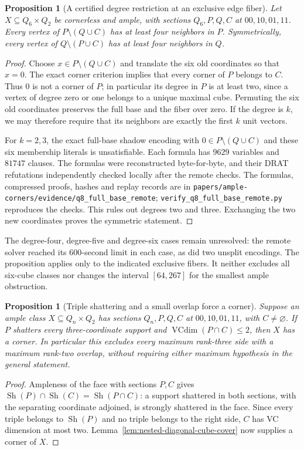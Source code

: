 \documentclass[11pt]{article}
\numberwithin{equation}{section}
\newtheorem{proposition}[theorem]{Proposition}
\theoremstyle{definition}
\theoremstyle{remark}
\begin{document}
\begin{proposition}[A certified degree restriction at an exclusive edge fiber]
\label{prop:full-base-exclusive-degree}
Let $X\subseteq Q_6\times Q_2$ be cornerless and ample, with sections
$Q_6,P,Q,C$ at $00,10,01,11$. Every vertex of
$P\setminus(Q\cup C)$ has at least four neighbors in $P$.
Symmetrically, every vertex of $Q\setminus(P\cup C)$ has at least
four neighbors in $Q$.
\end{proposition}
\begin{proof}
Choose $x\in P\setminus(Q\cup C)$ and translate the six old
coordinates so that $x=0$. The exact corner criterion implies that
every corner of $P$ belongs to $C$. Thus $0$ is not a corner of $P$;
in particular its degree in $P$ is at least two, since a vertex of
degree zero or one belongs to a unique maximal cube.
Permuting the six old coordinates preserves the full base and the
fiber over zero. If the degree is $k$, we may therefore require
that its neighbors are exactly the first $k$ unit vectors.

For $k=2,3$, the exact full-base shadow encoding with
$0\in P\setminus(Q\cup C)$ and these six membership literals is
unsatisfiable. Each formula has $9629$ variables and $81747$ clauses.
The formulas were reconstructed byte-for-byte, and their DRAT
refutations independently checked locally after the remote checks.
The formulas, compressed proofs, hashes and replay records are in
\texttt{papers/ample-corners/evidence/q8\_full\_base\_remote};
\texttt{verify\_q8\_full\_base\_remote.py} reproduces the checks.
This rules out degrees two and three. Exchanging the two new
coordinates proves the symmetric statement.
\end{proof}

The degree-four, degree-five and degree-six cases remain unresolved:
the remote solver reached its $600$-second limit in each case, as did
two unsplit encodings. The proposition applies only to the indicated
exclusive fibers. It neither excludes all six-cube classes nor changes
the interval $[64,267]$ for the smallest ample obstruction.

\begin{proposition}[Triple shattering and a small overlap force a corner]
\label{prop:maximum-relative-pair-no-completion}
Suppose an ample class $X\subseteq Q_n\times Q_2$ has sections
$Q_n,P,Q,C$ at $00,10,01,11$, with $C\ne\varnothing$.
If $P$ shatters every three-coordinate support and
$\operatorname{VCdim}(P\cap C)\le2$, then $X$ has a corner.
In particular this excludes every maximum rank-three side with a
maximum rank-two overlap, without requiring either maximum hypothesis
in the general statement.
\end{proposition}
\begin{proof}
Ampleness of the face with sections $P,C$ gives
$\operatorname{Sh}(P)\cap\operatorname{Sh}(C)
=\operatorname{Sh}(P\cap C)$: a support shattered in both sections,
with the separating coordinate adjoined, is strongly shattered in the
face. Since every triple belongs to $\operatorname{Sh}(P)$ and no
triple belongs to the right side, $C$ has VC dimension at most two.
Lemma~\ref{lem:nested-diagonal-cube-cover} now supplies a corner of $X$.
\end{proof}
\end{document}

